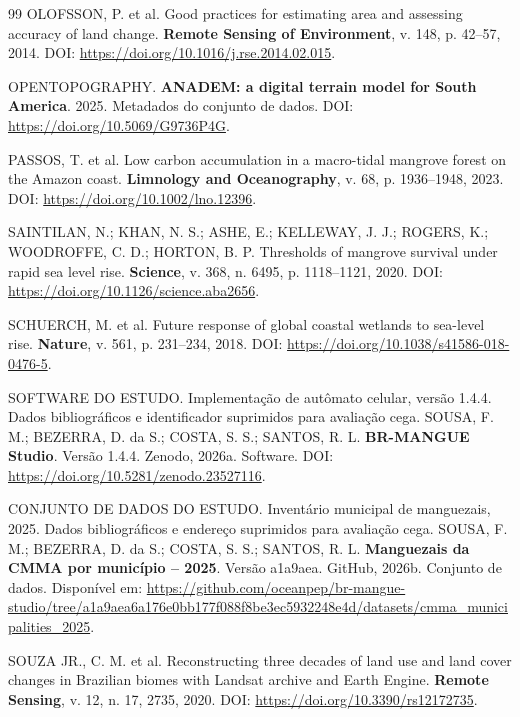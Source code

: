 \documentclass[12pt,a4paper]{article}
\begin{document}
\begin{thebibliography}{99}
OLOFSSON, P. et al. Good practices for estimating area and assessing accuracy of land change. \textbf{Remote Sensing of Environment}, v. 148, p. 42--57, 2014. DOI: \url{https://doi.org/10.1016/j.rse.2014.02.015}.

OPENTOPOGRAPHY. \textbf{ANADEM: a digital terrain model for South America}. 2025. Metadados do conjunto de dados. DOI: \url{https://doi.org/10.5069/G9736P4G}.

PASSOS, T. et al. Low carbon accumulation in a macro-tidal mangrove forest on the Amazon coast. \textbf{Limnology and Oceanography}, v. 68, p. 1936--1948, 2023. DOI: \url{https://doi.org/10.1002/lno.12396}.

SAINTILAN, N.; KHAN, N. S.; ASHE, E.; KELLEWAY, J. J.; ROGERS, K.; WOODROFFE, C. D.; HORTON, B. P. Thresholds of mangrove survival under rapid sea level rise. \textbf{Science}, v. 368, n. 6495, p. 1118--1121, 2020. DOI: \url{https://doi.org/10.1126/science.aba2656}.

SCHUERCH, M. et al. Future response of global coastal wetlands to sea-level rise. \textbf{Nature}, v. 561, p. 231--234, 2018. DOI: \url{https://doi.org/10.1038/s41586-018-0476-5}.

\ifdefined\VersaoCega
{}
SOFTWARE DO ESTUDO. Implementação de autômato celular, versão 1.4.4. Dados bibliográficos e identificador suprimidos para avaliação cega.
\else
{}
SOUSA, F. M.; BEZERRA, D. da S.; COSTA, S. S.; SANTOS, R. L. \textbf{BR-MANGUE Studio}. Versão 1.4.4. Zenodo, 2026a. Software. DOI: \url{https://doi.org/10.5281/zenodo.23527116}.
\fi

\ifdefined\VersaoCega
{}
CONJUNTO DE DADOS DO ESTUDO. Inventário municipal de manguezais, 2025. Dados bibliográficos e endereço suprimidos para avaliação cega.
\else
{}
SOUSA, F. M.; BEZERRA, D. da S.; COSTA, S. S.; SANTOS, R. L. \textbf{Manguezais da CMMA por município -- 2025}. Versão a1a9aea. GitHub, 2026b. Conjunto de dados. Disponível em: \url{https://github.com/oceanpep/br-mangue-studio/tree/a1a9aea6a176e0bb177f088f8be3ec5932248e4d/datasets/cmma_municipalities_2025}.
\fi

SOUZA JR., C. M. et al. Reconstructing three decades of land use and land cover changes in Brazilian biomes with Landsat archive and Earth Engine. \textbf{Remote Sensing}, v. 12, n. 17, 2735, 2020. DOI: \url{https://doi.org/10.3390/rs12172735}.


\end{thebibliography}
\end{document}
